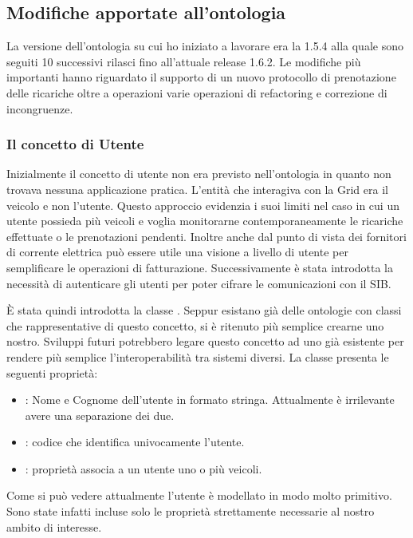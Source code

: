 \subsection{Modifiche apportate all'ontologia}

La versione dell'ontologia su cui ho iniziato a lavorare era la 1.5.4 alla quale sono seguiti 10 successivi rilasci fino all'attuale release 1.6.2. Le modifiche più importanti hanno riguardato il supporto di un nuovo protocollo di prenotazione delle ricariche oltre a operazioni varie operazioni di refactoring e correzione di incongruenze.

\subsubsection{Il concetto di Utente}\label{subsubsec:person}

Inizialmente il concetto di utente non era previsto nell'ontologia in quanto non trovava nessuna applicazione pratica.
L'entità che interagiva con la Grid era il veicolo e non l'utente. Questo approccio evidenzia i suoi limiti nel caso in cui un utente possieda più veicoli e voglia monitorarne contemporaneamente le ricariche effettuate o le prenotazioni pendenti. Inoltre anche dal punto di vista dei fornitori di corrente elettrica può essere utile una visione a livello di utente per semplificare le operazioni di fatturazione. Successivamente è stata introdotta la necessità di autenticare gli utenti per poter cifrare le comunicazioni con il SIB. 

È stata quindi introdotta la classe . Seppur esistano già delle ontologie con classi che rappresentative di questo concetto, si è ritenuto più semplice crearne uno nostro. Sviluppi futuri potrebbero legare questo concetto ad uno già esistente per rendere più semplice l'interoperabilità tra sistemi diversi. La classe presenta le seguenti proprietà:

\begin{itemize}
	\item {}: Nome e Cognome dell'utente in formato stringa. Attualmente è irrilevante avere una separazione dei due. 
	\item {}: codice che identifica univocamente l'utente.
	\item {}: proprietà associa a un utente uno o più veicoli.
\end{itemize}

\noindent
Come si può vedere attualmente l'utente è modellato in modo molto primitivo. Sono state infatti incluse solo le proprietà strettamente necessarie al nostro ambito di interesse. 

